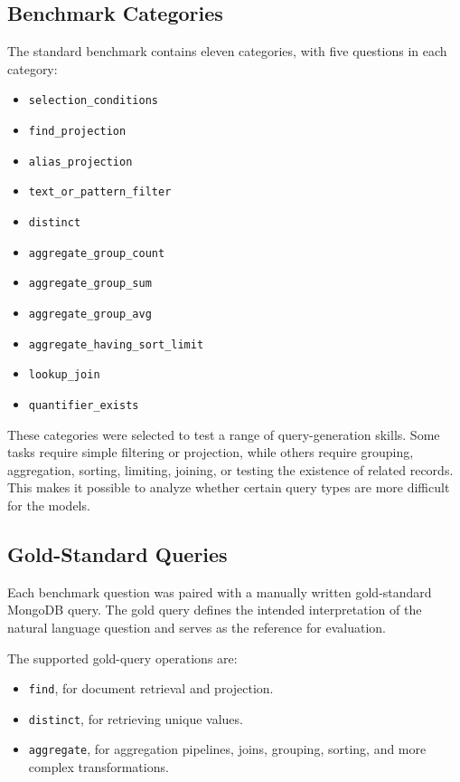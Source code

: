 \subsection{Benchmark Categories}

The standard benchmark contains eleven categories, with five questions in each category:

\begin{itemize}
    \item \texttt{selection\_conditions}
    \item \texttt{find\_projection}
    \item \texttt{alias\_projection}
    \item \texttt{text\_or\_pattern\_filter}
    \item \texttt{distinct}
    \item \texttt{aggregate\_group\_count}
    \item \texttt{aggregate\_group\_sum}
    \item \texttt{aggregate\_group\_avg}
    \item \texttt{aggregate\_having\_sort\_limit}
    \item \texttt{lookup\_join}
    \item \texttt{quantifier\_exists}
\end{itemize}

These categories were selected to test a range of query-generation skills. Some tasks require simple filtering or projection, while others require grouping, aggregation, sorting, limiting, joining, or testing the existence of related records. This makes it possible to analyze whether certain query types are more difficult for the models.

\subsection{Gold-Standard Queries}

Each benchmark question was paired with a manually written gold-standard MongoDB query. The gold query defines the intended interpretation of the natural language question and serves as the reference for evaluation.

The supported gold-query operations are:

\begin{itemize}
    \item \texttt{find}, for document retrieval and projection.
    \item \texttt{distinct}, for retrieving unique values.
    \item \texttt{aggregate}, for aggregation pipelines, joins, grouping, sorting, and more complex transformations.
\end{itemize}

